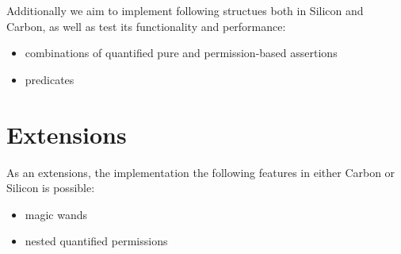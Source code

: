 \documentclass[12pt]{article}
\begin{document}
Additionally we aim to implement following structues both in Silicon and Carbon, as well as test its functionality and performance:
\begin{itemize}
\item combinations of quantified pure and permission-based assertions
\item predicates 
\end{itemize}

\section{Extensions}
As an extensions, the implementation the following features in either Carbon or Silicon is possible:
\begin{itemize}
\item magic wands
\item nested quantified permissions
\end{itemize}



\end{document}
